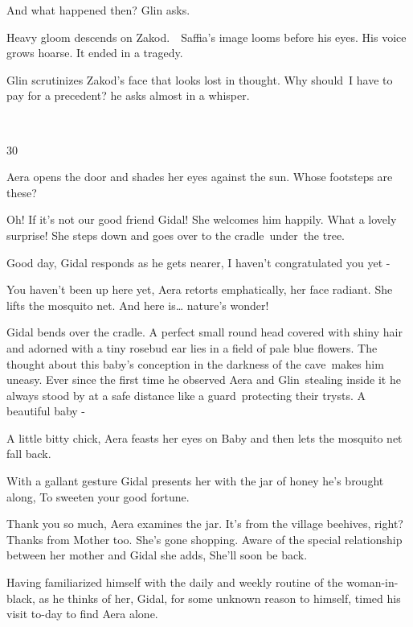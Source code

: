 \documentclass[twoside,11pt]{book}
\begin{document}
{\textquotedbl}And what happened then?{\textquotedbl} Glin asks. 

Heavy gloom descends on Zakod.\ \ Saffia's image looms before his eyes. His voice grows hoarse. {\textquotedbl}It ended
in a tragedy.{\textquotedbl} 

Glin scrutinizes Zakod's face that looks lost in thought. {\textquotedbl}Why
should{\ }I have to pay for a precedent?{\textquotedbl} he asks almost in a
whisper.

~

30~~ 

Aera opens the door and shades her eyes against the sun. Whose footsteps are these? 

{\textquotedbl}Oh! If it's not our good friend Gidal!{\textquotedbl} She welcomes him happily. {\textquotedbl}What a
lovely surprise!{\textquotedbl} She steps down and goes over to the
cradle~under{\ }the tree. 

{\textquotedbl}Good day,{\textquotedbl} Gidal responds as he gets nearer, {\textquotedbl}I haven't congratulated you yet
-{\textquotedbl} 

{\textquotedbl}You haven't been up here yet,{\textquotedbl} Aera retorts emphatically, her face radiant. She lifts the
mosquito net. {\textquotedbl}And here is{\dots} nature's wonder!{\textquotedbl} 

Gidal bends over the cradle. A perfect small round head covered with shiny hair and adorned with a tiny rosebud ear lies
in a field of pale blue flowers. The thought about this baby's conception in the darkness of the cave\ makes him
uneasy. Ever since the first time he observed Aera and Glin~stealing inside it he always stood by at a safe distance
like a guard\ protecting their trysts. {\textquotedbl}A beautiful baby -{\textquotedbl} 

{\textquotedbl}A little bitty chick,{\textquotedbl} Aera feasts her eyes on Baby and then lets the mosquito net fall
back.\ 

With a gallant gesture Gidal presents her with the jar of honey he's brought along, {\textquotedbl}To sweeten your good
fortune.{\textquotedbl} 

{\textquotedbl}Thank you so much,{\textquotedbl} Aera examines the jar. {\textquotedbl}It's from the village beehives,
right? Thanks from Mother too. She's gone shopping.{\textquotedbl} Aware of the special relationship between her mother
and Gidal she adds, {\textquotedbl}She'll soon be back.{\textquotedbl} 

Having familiarized himself with the daily and weekly routine of the woman-in-black, as he thinks of her, Gidal, for
some unknown reason to himself, timed his visit to-day to find Aera alone.
\end{document}
